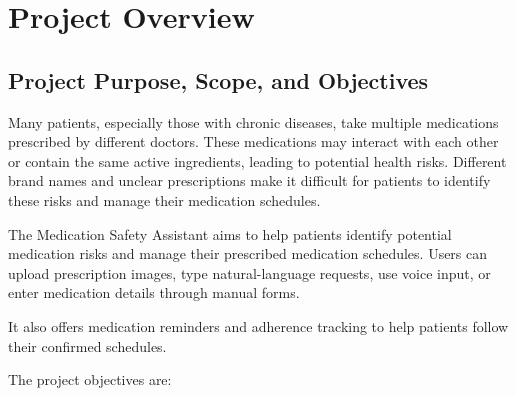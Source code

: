 

\section{Project Overview}



\subsection{Project Purpose, Scope, and Objectives}

Many patients, especially those with chronic diseases, take
multiple medications prescribed by different doctors.
These medications may interact with each other or contain
the same active ingredients, leading to potential health
risks. Different brand names and unclear prescriptions
make it difficult for patients to identify these risks
and manage their medication schedules.

The Medication Safety Assistant aims to help patients
identify potential medication risks and manage their
prescribed medication schedules.
Users can upload prescription images, type natural-language
requests, use voice input, or enter medication details
through manual forms.





It also offers medication reminders and adherence tracking
to help patients follow their confirmed schedules.


The project objectives are:


